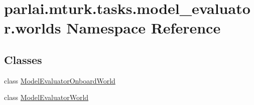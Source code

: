\hypertarget{namespaceparlai_1_1mturk_1_1tasks_1_1model__evaluator_1_1worlds}{}\section{parlai.\+mturk.\+tasks.\+model\+\_\+evaluator.\+worlds Namespace Reference}
\label{namespaceparlai_1_1mturk_1_1tasks_1_1model__evaluator_1_1worlds}
\subsection*{Classes}
\begin{DoxyCompactItemize}
\item 
class \hyperlink{classparlai_1_1mturk_1_1tasks_1_1model__evaluator_1_1worlds_1_1ModelEvaluatorOnboardWorld}{Model\+Evaluator\+Onboard\+World}
\item 
class \hyperlink{classparlai_1_1mturk_1_1tasks_1_1model__evaluator_1_1worlds_1_1ModelEvaluatorWorld}{Model\+Evaluator\+World}
\end{DoxyCompactItemize}
